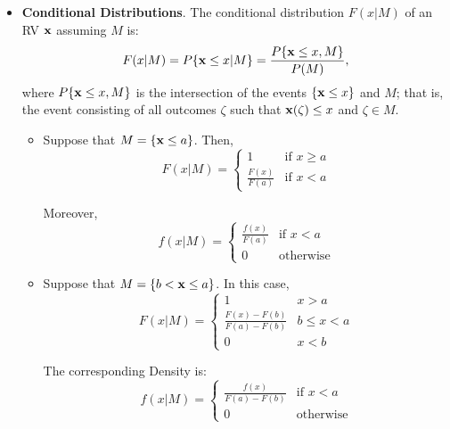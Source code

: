 \documentclass[a4paper, oneside]{book}
\begin{document}
\begin{itemize}
\item \textbf{Conditional Distributions}. The conditional distribution $F(x|M)$ of an RV $\mathbf x$ assuming $M$ is: 
$$F(x|M)=P\{\mathbf x \le x |M \} = \frac{P\{\mathbf x \le x, M\}}{P(M)},$$
where $P\{\mathbf x \le x, M\}$ is the intersection of the events $\{\mathbf x \le x\}$ and $M$; that is, the event consisting of all outcomes $\zeta$ such that $\mathbf x(\zeta)\le x$ and $\zeta \in M$. 
	\begin{itemize}
	\item Suppose that $M = \{\mathbf x \le a\}$. Then, 
	$$F (x | M) = \begin{cases}1& \text{if}\,\, x\ge a \\
	 \frac{F(x)}{F(a)} & \text{if}\,\, x< a\end{cases}$$
	 
	 Moreover, $$f(x|M) = \begin{cases}\frac{f(x)}{F(a)} & \text{if}\,\, x<a \\ 0 & \text{otherwise}\end{cases}$$
	\item Suppose that $M = \{b < \mathbf x \le a\}$. In this case,
	$$
	F(x|M) = \begin{cases}
	1  & x>a  \\ 
	\frac{F(x)-F(b)}{F(a)-F(b)} & b\le x < a \\
	0 & x < b
	\end{cases}
	$$
	
	The corresponding Density is: $$f(x|M) = \begin{cases}\frac{f(x)}{F(a)-F(b)} & \text{if}\,\, x<a \\ 0 & \text{otherwise}\end{cases}$$
	\end{itemize}

\end{itemize}
\end{document}
